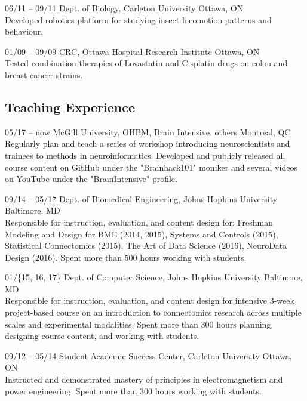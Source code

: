 \documentclass[]{friggeri-cv} %
\begin{document}
\begin{entrylist}
\begin{entrylist}
\entry
{06/11 -- 09/11}
{Dept. of Biology, Carleton University}
{Ottawa, ON}
{\\
Developed robotics platform for studying insect locomotion patterns and behaviour.}

\entry
{01/09 -- 09/09}
{CRC, Ottawa Hospital Research Institute}
{Ottawa, ON}
{\\
Tested combination therapies of Lovastatin and Cisplatin drugs on colon and breast cancer strains.}
\end{entrylist}

\subsection{Teaching Experience}

\begin{entrylist}
\entry
{05/17 -- now}
{McGill University, OHBM, Brain Intensive, others}
{Montreal, QC}
{ \\
Regularly plan and teach a series of workshop introducing neuroscientists and trainees to methods in neuroinformatics.
Developed and publicly released all course content on GitHub under the "Brainhack101" moniker and several videos on
YouTube under the "BrainIntensive" profile.}

\entry
{09/14 -- 05/17}
{Dept. of Biomedical Engineering, Johns Hopkins University}
{Baltimore, MD}
{ \\
Responsible for instruction, evaluation, and content design for: Freshman Modeling and Design
for BME (2014, 2015), Systems and Controls (2015), Statistical Connectomics (2015), The Art of
Data Science (2016), NeuroData Design (2016). Spent more than 500 hours working with students.}

\entry
{01/\{15, 16, 17\}}
{Dept. of Computer Science, Johns Hopkins University}
{Baltimore, MD}
{\\
Responsible for instruction, evaluation, and content design for intensive 3-week project-based course on an
introduction to connectomics research across multiple scales and experimental modalities. Spent more than 300 hours
planning, designing course content, and working with students.}

\entry
{09/12 -- 05/14}
{Student Academic Success Center, Carleton University}
{Ottawa, ON}
{\\
Instructed and demonstrated mastery of principles in electromagnetism and power engineering. Spent more than 300 hours
working with students.}
\end{entrylist}


\end{entrylist}
\end{document}
